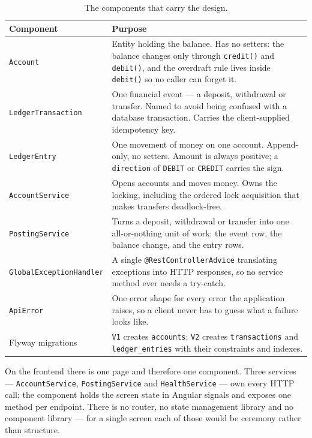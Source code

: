 \documentclass[11pt,a4paper]{article}
\begin{document}
\begin{table}[htbp]
\centering\small
\begin{tabular}{@{}L{4.9cm}L{9.6cm}@{}}
\toprule
\textbf{Component} & \textbf{Purpose} \\
\midrule
\texttt{Account} &
Entity holding the balance. Has no setters: the balance changes only through \texttt{credit()} and
\texttt{debit()}, and the overdraft rule lives inside \texttt{debit()} so no caller can forget it. \\
\addlinespace
\texttt{LedgerTransaction} &
One financial event --- a deposit, withdrawal or transfer. Named to avoid being confused with a
database transaction. Carries the client-supplied idempotency key. \\
\addlinespace
\texttt{LedgerEntry} &
One movement of money on one account. Append-only, no setters. Amount is always positive; a
\texttt{direction} of \texttt{DEBIT} or \texttt{CREDIT} carries the sign. \\
\addlinespace
\texttt{AccountService} &
Opens accounts and moves money. Owns the locking, including the ordered lock acquisition that
makes transfers deadlock-free. \\
\addlinespace
\texttt{PostingService} &
Turns a deposit, withdrawal or transfer into one all-or-nothing unit of work: the event row, the
balance change, and the entry rows. \\
\addlinespace
\texttt{GlobalExceptionHandler} &
A single \texttt{@RestControllerAdvice} translating exceptions into HTTP responses, so no service
method ever needs a try-catch. \\
\addlinespace
\texttt{ApiError} &
One error shape for every error the application raises, so a client never has to guess what a
failure looks like. \\
\addlinespace
Flyway migrations &
\texttt{V1} creates \texttt{accounts}; \texttt{V2} creates \texttt{transactions} and
\texttt{ledger\_entries} with their constraints and indexes. \\
\bottomrule
\end{tabular}
\caption{The components that carry the design.}
\end{table}

On the frontend there is one page and therefore one component. Three services ---
\texttt{AccountService}, \texttt{PostingService} and \texttt{HealthService} --- own every HTTP
call; the component holds the screen state in Angular signals and exposes one method per endpoint. There is no router, no state
management library and no component library --- for a single screen each of those would be
ceremony rather than structure.
\end{document}
